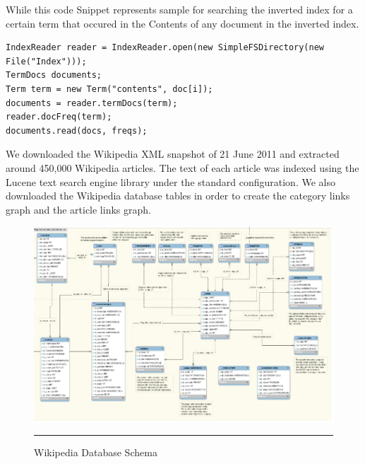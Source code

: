 While this code Snippet represents sample for searching the inverted index for a certain term that occured in the Contents of any document in the inverted index.\\

\begin{lstlisting}
IndexReader reader = IndexReader.open(new SimpleFSDirectory(new File("Index")));
TermDocs documents;
Term term = new Term("contents", doc[i]);
documents = reader.termDocs(term);
reader.docFreq(term);
documents.read(docs, freqs);
\end{lstlisting}

We downloaded the Wikipedia XML snapshot of 21 June 2011 and extracted around 450,000 Wikipedia articles. The text of each article was indexed using the Lucene text search engine library \citep{lucene} under the standard configuration. We also downloaded the Wikipedia database tables in order to create the category links graph and the article links graph.\\
\begin{figure}[htbp]
	\centering
		\includegraphics{./Figures/wiki_DB.png}
		\rule{35em}{0.05pt}
	\caption[Wikipedia Database Schema]{Wikipedia Database Schema}
	\label{fig:wiki_DB}
\end{figure}
